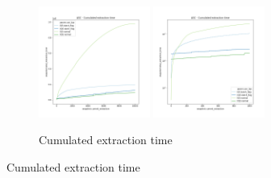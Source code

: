 \begin{figure}
    \centering
    \begin{subfigure}[b]{\textwidth}
        \centering
        \includegraphics[width=0.40\textwidth]{./fragments/04_experimental_execution/images/02_benchmark_02_sort_a_case.png.0_0.png}
        \includegraphics[width=0.40\textwidth]{./fragments/04_experimental_execution/images/02_benchmark_02_sort_a_case.png.0_1.png}
        \caption{Cumulated extraction time}
        \label{FIG:PARTITION_SCHEME_01_ASCENDING__0_0}
    \end{subfigure}


\end{figure}
